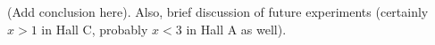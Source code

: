 (Add conclusion here). Also, brief discussion of future experiments (certainly $x>1$ in Hall C, probably $x<3$ in Hall A as well).

	
